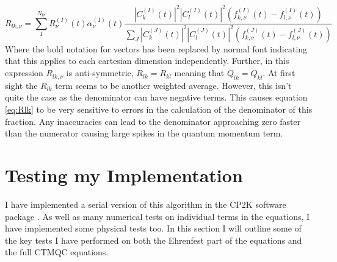 \begin{equation}
  R_{lk, \nu} = \sum_{I}^{N_{tr}} R_{\nu}^{(I)}(t) \alpha_{\nu}^{(I)}(t) \frac{|C_{k}^{(I)}(t)|^2 |C_{l}^{(I)}(t)|^2 \left( f_{k, \nu}^{(I)}(t) - f_{l, \nu}^{(I)}(t) \right)}{\sum_{J} |C_{k}^{(J)}(t)|^2 |C_{l}^{(J)}(t)|^2 \left( f_{k, \nu}^{(J)}(t) - f_{l, \nu}^{(J)}(t) \right)}
  \label{eq:Rlk}
\end{equation}
Where the bold notation for vectors has been replaced by normal font indicating that this applies to each cartesian dimension independently. Further, in this expression $R_{lk, \nu}$ is anti-symmetric, $R_{lk} = R_{kl}$ meaning that $Q_{lk} = Q_{kl}$. At first sight the $R_{lk}$ term seems to be another weighted average. However, this isn't quite the case as the denominator can have negative terms. This causes equation \eqref{eq:Rlk} to be very sensitive to errors in the calculation of the denominator of this fraction. Any inaccuracies can lead to the denominator approaching zero faster than the numerator causing large spikes in the quantum momentum term.

\section{Testing my Implementation}
I have implemented a serial version of this algorithm in the CP2K software package \cite{CP2K}. As well as many numerical tests on individual terms in the equations, I have implemented some physical tests too. In this section I will outline some of the key tests I have performed on both the Ehrenfest part of the equations and the full CTMQC equations.
